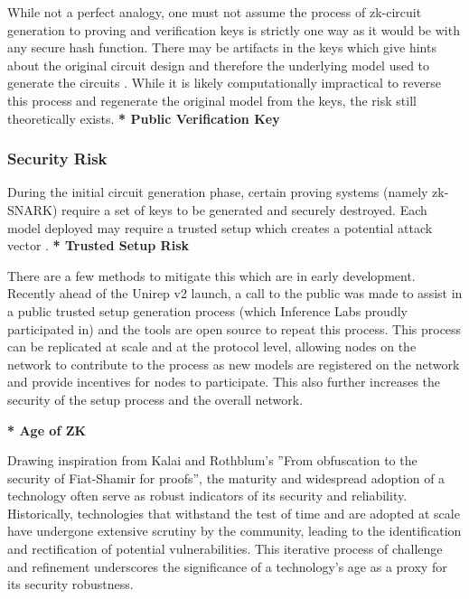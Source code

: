 \documentclass[conference]{IEEEtran}
\begin{document}
While not a perfect analogy, one must not assume the process of zk-circuit generation to proving and veriﬁcation keys is strictly one way as it would be with any secure hash function. There may be artifacts in the keys which give hints about the original circuit design and therefore the underlying model used to generate the circuits . While it is likely computationally impractical to reverse this process and regenerate the original model from the keys, the risk still theoretically exists.
\textbf{* Public Veriﬁcation Key}

\subsubsection{Security Risk}

During the initial circuit generation phase, certain proving systems (namely zk-SNARK) require a set of keys to be generated and securely destroyed. Each model deployed may require a trusted setup which creates a potential attack vector .
\textbf{* Trusted Setup Risk}

There are a few methods to mitigate this which are in early development. Recently ahead of the Unirep v2 launch, a call to the public was made to assist in a public trusted setup generation process (which Inference Labs proudly participated in) and the tools are open source to repeat this process. This process can be replicated at scale and at the protocol level, allowing nodes on the network to contribute to the process as new models are registered on the network and provide incentives for nodes to participate. This also further increases the security of the setup process and the overall network.


\textbf{* Age of ZK}

Drawing inspiration from Kalai and Rothblum’s ”From obfuscation to the security of Fiat-Shamir for proofs”, the maturity and widespread adoption of a technology often serve as robust indicators of its security and reliability. Historically, technologies that withstand the test of time and are adopted at scale have undergone extensive scrutiny by the community, leading to the identiﬁcation and rectiﬁcation of potential vulnerabilities. This iterative process of challenge and reﬁnement underscores the signiﬁcance of a technology’s age as a proxy for its security robustness.
\end{document}
